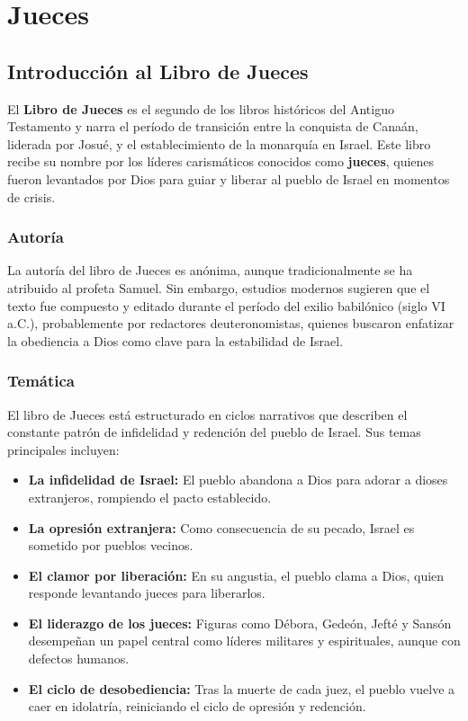 
\chapter{Jueces}

\section*{Introducción al Libro de Jueces}

El \textbf{Libro de Jueces} es el segundo de los libros históricos del Antiguo Testamento y narra el período de transición entre la conquista de Canaán, liderada por Josué, y el establecimiento de la monarquía en Israel. Este libro recibe su nombre por los líderes carismáticos conocidos como \textbf{jueces}, quienes fueron levantados por Dios para guiar y liberar al pueblo de Israel en momentos de crisis.

\subsection*{Autoría}

La autoría del libro de Jueces es anónima, aunque tradicionalmente se ha atribuido al profeta Samuel. Sin embargo, estudios modernos sugieren que el texto fue compuesto y editado durante el período del exilio babilónico (siglo VI a.C.), probablemente por redactores deuteronomistas, quienes buscaron enfatizar la obediencia a Dios como clave para la estabilidad de Israel.

\subsection*{Temática}

El libro de Jueces está estructurado en ciclos narrativos que describen el constante patrón de infidelidad y redención del pueblo de Israel. Sus temas principales incluyen:
\begin{itemize}
	\item \textbf{La infidelidad de Israel:} El pueblo abandona a Dios para adorar a dioses extranjeros, rompiendo el pacto establecido.
	\item \textbf{La opresión extranjera:} Como consecuencia de su pecado, Israel es sometido por pueblos vecinos.
	\item \textbf{El clamor por liberación:} En su angustia, el pueblo clama a Dios, quien responde levantando jueces para liberarlos.
	\item \textbf{El liderazgo de los jueces:} Figuras como Débora, Gedeón, Jefté y Sansón desempeñan un papel central como líderes militares y espirituales, aunque con defectos humanos.
	\item \textbf{El ciclo de desobediencia:} Tras la muerte de cada juez, el pueblo vuelve a caer en idolatría, reiniciando el ciclo de opresión y redención.
\end{itemize}



